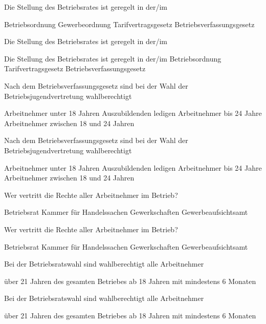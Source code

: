 \documentclass{exam}
\begin{document}
\begin{center}
\begin{questions}
		\question Die Stellung des Betriebsrates ist geregelt  in der/im
		\begin{checkboxes}
			\choice Betriebsordnung 
			\choice Gewerbeordnung
			\choice Tarifvertragsgesetz
			\choice Betriebsverfassungsgesetz
		\end{checkboxes}
		\newpage
		\printanswers 
		Die Stellung des Betriebsrates ist geregelt  in der/im
		\begin{checkboxes}
			\choice Die Stellung des Betriebsrates ist geregelt  in der/im
			\choice Betriebsordnung 
			\choice Tarifvertragsgesetz
			\CorrectChoice Betriebsverfassungsgesetz
		\end{checkboxes}
		
		\question Nach dem Betriebsverfassungsgesetz sind bei der Wahl der Betriebsjugendvertretung wahlberechtigt 
		\begin{checkboxes}
			\choice Arbeitnehmer unter 18 Jahren 
			\choice Auszubildenden
			\choice ledigen Arbeitnehmer bis 24 Jahre
			\choice Arbeitnehmer zwischen 18 und 24 Jahren
		\end{checkboxes}
		\newpage
		\printanswers
		Nach dem Betriebsverfassungsgesetz sind bei der Wahl der Betriebsjugendvertretung wahlberechtigt 
		\begin{checkboxes}
			\CorrectChoice Arbeitnehmer unter 18 Jahren 
			\choice Auszubildenden
			\choice ledigen Arbeitnehmer bis 24 Jahre
			\choice Arbeitnehmer zwischen 18 und 24 Jahren
		\end{checkboxes}
	
		\question Wer vertritt die Rechte aller Arbeitnehmer im Betrieb?
		\begin{checkboxes}
			\choice Betriebsrat
			\choice Kammer für Handelssachen
			\choice Gewerkschaften
			\choice Gewerbeaufsichtsamt
		\end{checkboxes}
		\newpage
		\printanswers
		Wer vertritt die Rechte aller Arbeitnehmer im Betrieb?
		\begin{checkboxes}
			\CorrectChoice Betriebsrat
			\choice Kammer für Handelssachen
			\choice Gewerkschaften
			\choice Gewerbeaufsichtsamt
		\end{checkboxes}
		
		\question  Bei der Betriebsratswahl sind wahlberechtigt alle Arbeitnehmer
		\begin{checkboxes}
			\choice über 21 Jahren
			\choice des gesamten Betriebes
			\choice ab 18 Jahren
			\choice mit mindestens 6 Monaten 
		\end{checkboxes}
		\newpage
		\printanswers
		Bei der Betriebsratswahl sind wahlberechtigt alle Arbeitnehmer
		\begin{checkboxes}
			\choice über 21 Jahren
			\choice des gesamten Betriebes
			\CorrectChoice ab 18 Jahren
			\choice mit mindestens 6 Monaten 
		\end{checkboxes}
	

\end{questions}
\end{center}
\end{document}
